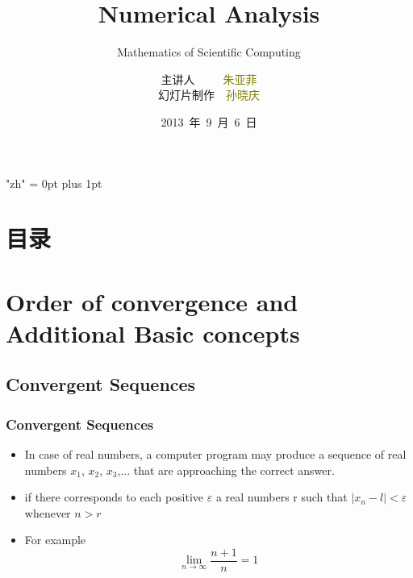 \documentclass[notheorems,mathserif,table,compress]{beamer}  %
\begin{document}
\XeTeXlinebreaklocale "zh"         %
\XeTeXlinebreakskip = 0pt plus 1pt %
\title[Numerical Analysis]{Numerical Analysis}
\subtitle{Mathematics of Scientific Computing}
\author[qiu]{主讲人~~~~~\textcolor{olive}{朱亚菲}\\
    \quad 幻灯片制作~~\textcolor{olive}{孙晓庆}}
\institute[中国海洋大学]{\small\textcolor{violet}{中国海洋大学~~信息科学与工程学院}}
\date{2013~年~9~月~6~日}
\frame{ \titlepage }
\section*{目录}
\section{Order of convergence and Additional Basic  concepts}
\subsection{Convergent Sequences} %
\begin{frame}
  \frametitle{Convergent Sequences}
  \begin{itemize}
  \item In case of real numbers, a computer program may produce a sequence of real numbers $x_1$, $x_2$, $x_3$,... that are approaching the correct answer.
  \item if there corresponds to each positive $\varepsilon$ a real numbers r such that $|x_{n}-l|< \varepsilon$ whenever $n>r$ 
  \item For example  
\begin{displaymath} 
\lim_{n \to \infty}\frac{n+1}{n}=1
\end{displaymath}
  \end{itemize}
\end{frame}
\end{document}

